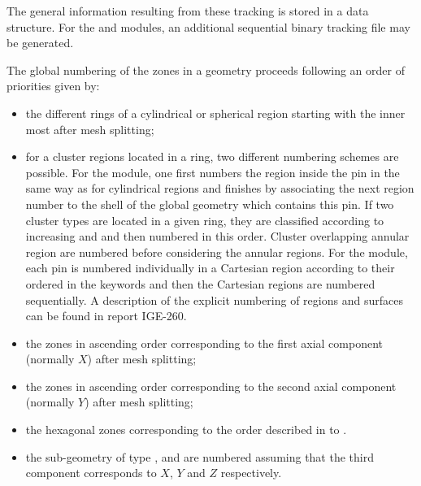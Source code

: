 \vskip 0.15cm

The general information resulting from these
tracking is stored in a  data structure.
For the  and  modules, an additional sequential binary
tracking file may be generated.

\vskip 0.15cm

The global numbering of the zones in a geometry proceeds following an
order of priorities given by:

\begin{itemize}

\item the different rings of a cylindrical or spherical region starting with the
inner most after mesh splitting;

\item for a cluster regions located in a ring, two different numbering schemes are possible. For the  
module, one first numbers the region inside the pin in the same way as for cylindrical regions and finishes 
by associating the next region number to the shell of the global geometry which contains this pin. If two 
cluster types are located in a given ring, they are classified according to increasing  and  and then 
numbered in this order. Cluster overlapping annular region are numbered before considering the annular 
regions. For the  module, each pin is numbered individually in a Cartesian region according to their 
ordered in the  keywords and then the Cartesian regions are numbered sequentially. A description 
of the explicit numbering of regions and surfaces can be found in report IGE-260.\cite{ige260}
 
\item the zones in ascending order corresponding to the first axial component
(normally $X$) after mesh splitting;

\item the zones in ascending order corresponding to the second axial component
(normally $Y$) after mesh splitting;

\item the hexagonal zones corresponding to the order described in
 to .

\item  the sub-geometry of type ,  and
 are numbered assuming that the third component corresponds to 
$X$, $Y$ and $Z$ respectively.

\end{itemize}
 
